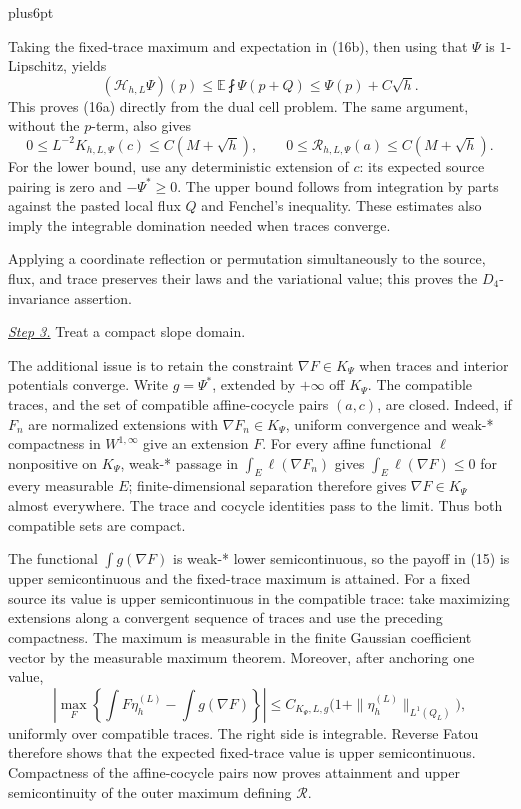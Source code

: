 \documentclass[11pt,reqno]{amsart}
\makeatletter
\theoremstyle{plain}
\theoremstyle{definition}
\theoremstyle{remark}
\renewenvironment{proof}[1][\proofname]{%
  \par
  \pushQED{\qed}%
  \normalfont
  \topsep6pt plus6pt\relax
  \trivlist
  \item[\hskip\labelsep\slshape #1\@addpunct{.}]%
  \ignorespaces
}{%
  \popQED
  \endtrivlist
  \@endpefalse
}
\DeclareRobustCommand{\qed}{%
  \leavevmode\unskip\penalty9999\hbox{}\nobreak
  \ifmmode
    \makebox[0pt][l]{\qquad\hbox{\qedsymbol}}%
  \else
    \qquad\hbox{\qedsymbol}%
  \fi
}
\renewcommand{\qedsymbol}{\rule[.47pt]{4pt}{6pt}}
\numberwithin{equation}{section}
\newcommand{\1}{\mathbf 1}
\makeatother
\begin{document}
\begin{proof}
Taking the fixed-trace maximum and expectation in (16b), then using that
$\Psi$ is $1$-Lipschitz, yields
\begin{equation}
(\mathcal H_ {h,L}\Psi)(p)
\leq\mathbb E\fint\Psi(p+Q)\leq\Psi(p)+C\sqrt h.
\tag{16c}
\end{equation}
This proves (16a) directly from the dual cell problem.
The same argument, without the $p$-term, also gives
\begin{equation}
0\leq L^{-2}K_ {h,L,\Psi}(c)\leq C(M+\sqrt h),
\qquad 0\leq \mathcal R_ {h,L,\Psi}(a)\leq C(M+\sqrt h).
\tag{16d}
\end{equation}
For the lower bound, use any deterministic extension of $c$: its
expected source pairing is zero and $-\Psi^*\geq0$.  The upper bound
follows from integration by parts against the pasted local flux $Q$
and Fenchel's inequality.  These estimates also imply the integrable
domination needed when traces converge.

Applying a coordinate reflection or permutation simultaneously to the
source, flux, and trace preserves their laws and the variational value;
this proves the $D_ 4$-invariance assertion.

\smallskip\noindent
\underline{\textit{Step 3.}} Treat a compact slope domain.

The additional issue is to retain the constraint
$\nabla F\in K_\Psi$ when traces and interior potentials converge.
Write $g=\Psi^*$, extended by
$+\infty$ off $K_ \Psi$.  The compatible traces, and the set of
compatible affine-cocycle pairs $(a,c)$, are closed.  Indeed, if
$F_ n$ are normalized extensions with
$\nabla F_ n\in K_ \Psi$, uniform convergence and weak-* compactness in
$W^{1,\infty}$ give an extension $F$.  For every affine functional
$\ell$ nonpositive on $K_ \Psi$, weak-* passage in
$\int_ E\ell(\nabla F_ n)$ gives
$\int_ E\ell(\nabla F)\leq0$ for every measurable $E$;
finite-dimensional separation therefore gives
$\nabla F\in K_ \Psi$ almost everywhere.  The trace and cocycle
identities pass to the limit.  Thus both compatible sets are compact.

The functional $\int g(\nabla F)$ is weak-* lower semicontinuous, so
the payoff in (15) is upper semicontinuous and the fixed-trace maximum
is attained.  For a fixed source its value is upper semicontinuous in
the compatible trace: take maximizing extensions along a convergent
sequence of traces and use the preceding compactness.  The maximum is
measurable in the finite Gaussian coefficient vector by the measurable
maximum theorem.  Moreover, after anchoring one value,
\begin{equation}
\left|\max_ F\left\{\int F\eta_ h^{(L)}-\int g(\nabla F)\right\}\right|
\leq C_ {K_ \Psi,L,g}\bigl(1+\|\eta_ h^{(L)}\|_ {L^1(Q_ L)}\bigr),
\tag{16s}
\end{equation}
uniformly over compatible traces.  The right side is integrable.
Reverse Fatou therefore shows that the expected fixed-trace value is
upper semicontinuous.  Compactness of the affine-cocycle pairs now
proves attainment and upper semicontinuity of the outer maximum
defining $\mathcal R$.


\end{proof}
\end{document}
